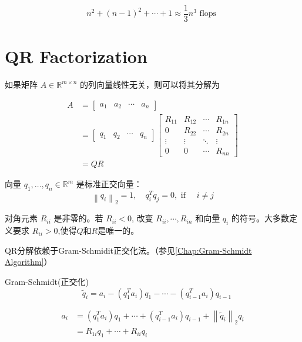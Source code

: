 $$ n^{2}+(n-1)^{2}+\cdots+1 \approx \frac{1}{3} n^{3}\text{ flops }$$ 

\section{QR Factorization}

如果矩阵 $ A \in \mathbb{R}^{m \times n} $ 的列向量线性无关，则可以将其分解为

\begin{definition}[QR Factorization]
    
    $$\begin{aligned} A&=\left[\begin{array}{llll}a_{1} & a_{2} & \cdots & a_{n}\end{array}\right]\\
    &=\left[\begin{array}{llll}q_{1} & q_{2} & \cdots & q_{n}\end{array}\right]\left[\begin{array}{cccc}R_{11} & R_{12} & \cdots & R_{1 n} \\ 0 & R_{22} & \cdots & R_{2 n} \\ \vdots & \vdots & \ddots & \vdots \\ 0 & 0 & \cdots & R_{n n}\end{array}\right]\\
    &=QR
    \end{aligned}$$

向量 $ q_{1}, \ldots, q_{n} \in \mathbb{R}^{m} $ 是标准正交向量：
$$
\left\|q_{i}\right\|_{2}=1, \quad q_{i}^{T} q_{j}=0, \text { if } \quad i \neq j
$$

对角元素 $ R_{i i} $ 是非零的。若 $ R_{i i}<0 $, 改变 $ R_{i i}, \cdots, R_{i n} $ 和向量 $ q_{i} $ 的符号。大多数定义要求 $ R_{i i}>0 $,使得$Q$和$R$是唯一的。
\end{definition}

QR分解依赖于Gram-Schmidit正交化法。（参见\ref{Chap:Gram-Schmidt Algorithm}）

\begin{remark}
    Gram-Schmidt(正交化) $$ \quad \widetilde{q}_{i}=a_{i}-\left(q_{1}^{T} a_{i}\right) q_{1}-\cdots-\left(q_{i-1}^{T} a_{i}\right) q_{i-1} $$

    $$ \begin{aligned}
        a_{i}&=\left(q_{1}^{T} a_{i}\right) q_{1}+\cdots+\left(q_{i-1}^{T} a_{i}\right) q_{i-1} + \left\|\tilde{q}_{i}\right\|_{2} q_{i}
        \\ &=R_{1 i} q_{1}+\cdots+R_{i i} q_{i}
    \end{aligned}
      $$
\end{remark}

